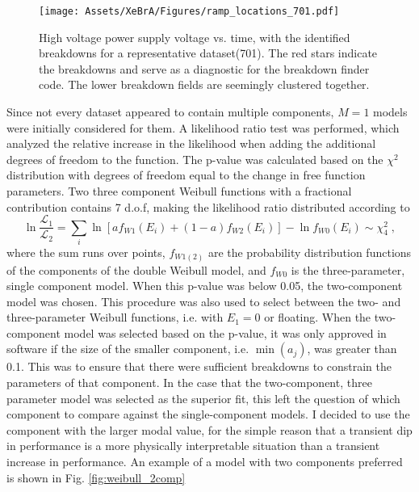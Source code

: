 \begin{figure}
    \centering
    \texttt{[image: Assets/XeBrA/Figures/ramp\_locations\_701.pdf]}
    \caption[High voltage power supply voltage vs. time, with the identified breakdowns for a representative dataset]%
    {High voltage power supply voltage vs. time, with the identified breakdowns for a representative dataset(701). 
    The red stars indicate the breakdowns and serve as a diagnostic for the breakdown finder code.
    The lower breakdown fields are seemingly clustered together.}
    \label{fig:ramp_locations}
\end{figure}

Since not every dataset appeared to contain multiple components, $M=1$ models were initially considered for them.
A likelihood ratio test was performed, which analyzed the relative increase in the likelihood when adding the additional degrees of freedom to the function.
The p-value was calculated based on the $\chi^2$ distribution with degrees of freedom equal to the change in free function parameters.
Two three component Weibull functions with a fractional contribution contains 7 d.o.f, making the likelihood ratio distributed according to \begin{equation}
    \ln\frac{\mathcal{L}_1}{\mathcal{L}_2} = \sum_i \ln [af_{W1} (E_i) + (1-a) f_{W2} (E_i)] - \ln f_{W0}(E_i) \sim \chi_4^2\;,
\end{equation}
\noindent
where the sum runs over points,  $f_{W1(2)}$ are the probability distribution functions of the components of the double Weibull model, and $f_{W0}$ is the three-parameter, single component model.
When this p-value was below 0.05, the two-component model was chosen.
This procedure was also used to select between the two- and three-parameter Weibull functions, i.e. with $E_1=0$ or floating.
When the two-component model was selected based on the p-value, it was only approved in software if the size of the smaller component, i.e. $\min(a_j)$, was greater than 0.1.
This was to ensure that there were sufficient breakdowns to constrain the parameters of that component.
In the case that the two-component, three parameter model was selected as the superior fit, this left the question of which component to compare against the single-component models.
I decided to use the component with the larger modal value, for the simple reason that a transient dip in performance is a more physically interpretable situation than a transient increase in performance.
An example of a model with two components preferred is shown in Fig. \ref{fig:weibull_2comp}

